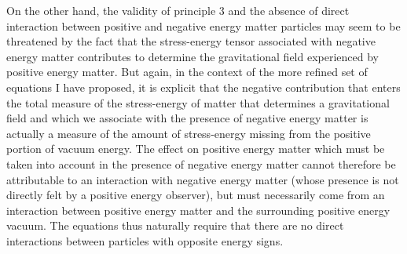 \documentclass[notitlepage,12pt]{report}
\begin{document}
On the other hand, the validity of principle 3 and the absence of direct interaction between positive and negative energy matter particles may seem to be threatened by the fact that the stress-energy tensor associated with negative energy matter contributes to determine the gravitational field experienced by positive energy matter. But again, in the context of the more refined set of equations I have proposed, it is explicit that the negative contribution that enters the total measure of the stress-energy of matter that determines a gravitational field and which we associate with the presence of negative energy matter is actually a measure of the amount of stress-energy missing from the positive portion of vacuum energy. The effect on positive energy matter which must be taken into account in the presence of negative energy matter cannot therefore be attributable to an interaction with negative energy matter (whose presence is not directly felt by a positive energy observer), but must necessarily come from an interaction between positive energy matter and the surrounding positive energy vacuum. The equations thus naturally require that there are no direct interactions between particles with opposite energy signs.
\end{document}
